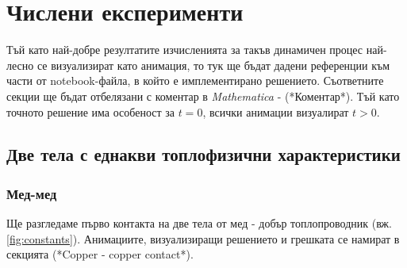 \section{Числени експерименти}
Тъй като най-добре резултатите изчисленията за такъв динамичен процес най-лесно се визуализират като анимация, то тук ще бъдат дадени референции към части от notebook-файла, в който е имплементирано решението.
Съответните секции ще бъдат отбелязани с коментар в \textit{Mathematica} - \textcolor{comment}{(*Коментар*)}.
Тъй като точното решение има особеност за $t = 0$, всички анимации визуалират $t>0$.
\subsection{Две тела с еднакви топлофизични характеристики}
\subsubsection{Мед-мед}
Ще разгледаме първо контакта на две тела от мед - добър топлопроводник (вж. \autoref{fig:constants}). Анимациите, визуализиращи решението и грешката се намират в секцията  \textcolor{comment}{(*Copper - copper contact*)}.